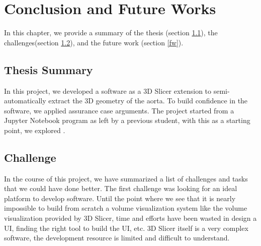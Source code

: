 \chapter{Conclusion and Future Works}

In this chapter, we provide a summary of the thesis (section \ref{thesis_sum}), the challenges(section \ref{challenge}), and the future work (section \ref{fw}).

\section{Thesis Summary}\label{thesis_sum}

In this project, we developed a software as a 3D Slicer extension to semi-automatically extract the 3D geometry of the aorta. To build confidence in the software, we applied assurance case arguments. The project started from a Jupyter Notebook program as left by a previous student, with this as a starting point, we explored . 


\section{Challenge}\label{challenge}
In the course of this project, we have summarized a list of challenges and tasks that we could have done better. The first challenge was looking for an ideal platform to develop \progname{} software. Until the point where we see that it is nearly impossible to build from scratch a volume visualization system like the volume visualization provided by 3D Slicer, time and efforts have been wasted in design a UI, finding the right tool to build the UI, etc. 3D Slicer itself is a very complex software, the development resource is limited and difficult to understand.

